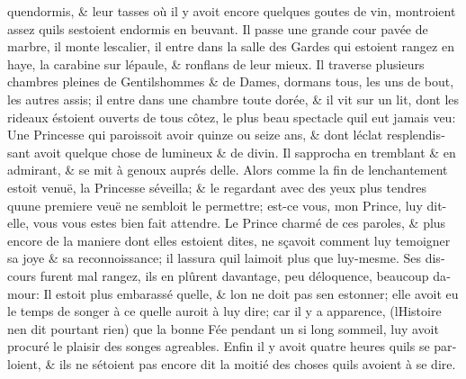\documentclass[14pt,a4paper]{memoir}
\begin{document}
{{\begin{otherlanguage}{french}
qu\textquotesingle endormis, \& leur tasses où il y avoit encore
quelques goutes de vin, montroient assez qu\textquotesingle ils
s\textquotesingle estoient endormis en beuvant. Il passe une grande cour
pavée de marbre, il monte l\textquotesingle escalier, il entre dans la
salle des Gardes qui estoient rangez en haye, la carabine sur
l\textquotesingle épaule, \& ronflans de leur mieux. Il traverse
plusieurs chambres pleines de Gentilshommes \& de Dames, dormans tous,
les uns de bout, les autres assis; il entre dans une chambre toute
dorée, \& il vit sur un lit, dont les rideaux éstoient ouverts de tous
côtez, le plus beau spectacle qu\textquotesingle il eut jamais veu: Une
Princesse qui paroissoit avoir quinze ou seize ans, \& dont
l\textquotesingle éclat resplendissant avoit quelque chose de lumineux
\& de divin. Il s\textquotesingle approcha en tremblant \& en admirant,
\& se mit à genoux auprés d\textquotesingle elle. Alors comme la fin de
l\textquotesingle enchantement estoit venuë, la Princesse
s\textquotesingle éveilla; \& le regardant avec des yeux plus tendres
qu\textquotesingle une premiere veuë ne sembloit le permettre; est-ce
vous, mon Prince, luy dit-elle, vous vous estes bien fait attendre. Le
Prince charmé de ces paroles, \& plus encore de la maniere dont elles
estoient dites, ne sçavoit comment luy temoigner sa joye \& sa
reconnoissance; il l\textquotesingle assura qu\textquotesingle il
l\textquotesingle aimoit plus que luy-mesme. Ses discours furent mal
rangez, ils en plûrent davantage, peu d\textquotesingle éloquence,
beaucoup d\textquotesingle amour: Il estoit plus embarassé
qu\textquotesingle elle, \& l\textquotesingle on ne doit pas
s\textquotesingle en estonner; elle avoit eu le temps de songer à ce
qu\textquotesingle elle auroit à luy dire; car il y a apparence,
(l\textquotesingle Histoire n\textquotesingle en dit pourtant rien) que
la bonne Fée pendant un si long sommeil, luy avoit procuré le plaisir
des songes agreables. Enfin il y avoit quatre heures
qu\textquotesingle ils se parloient, \& ils ne s\textquotesingle étoient
pas encore dit la moitié des choses qu\textquotesingle ils avoient à se
dire.


\end{otherlanguage}}}
\end{document}
